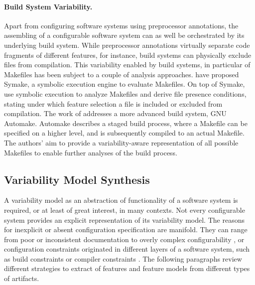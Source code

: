 \paragraph{Build System Variability.} Apart from
configuring software systems using preprocessor annotations, the assembling of
a configurable software system can as well be orchestrated by its underlying
build system. While preprocessor annotations virtually separate code fragments
of different features, for instance, build systems can physically exclude files
from compilation. This variability enabled by build systems, in particular of
Makefiles has been subject to a couple of analysis approaches. \cite{tamrawi_build_2012} have
proposed Symake, a symbolic execution engine to evaluate Makefiles.
On top of Symake, \cite{zhou_extracting_2015} use symbolic execution to analyze
Makefiles and derive file presence conditions, stating under which feature
selection a file is included or excluded from compilation. The work of
\cite{al-kofahi_escaping_2016} addresses a more advanced build system, GNU Automake.
Automake describes a staged build process, where a Makefile can be specified on
a higher level, and is subsequently compiled to an actual Makefile. The
authors’ aim to provide a variability-aware representation of all possible
Makefiles to enable further analyses of the build process.

\subsection{Variability Model Synthesis} \label{sec:feature_model_synthesis} 
A variability model as an abstraction of functionality of a software system is
required, or at least of great interest, in many contexts. Not every
configurable system provides an explicit representation of its variability
model. The reasons for inexplicit or absent configuration specification are
manifold. They can range from poor or inconsistent documentation \cite{rabkin_static_2011} to
overly complex configurability \citep{xu_hey_2015}, or configuration constraints
originated in different layers of a software system, such as build constraints or compiler constraints \cite{nadi_where_2015}. The
following paragraphs review different strategies to extract of features and
feature models from different types of artifacts.

